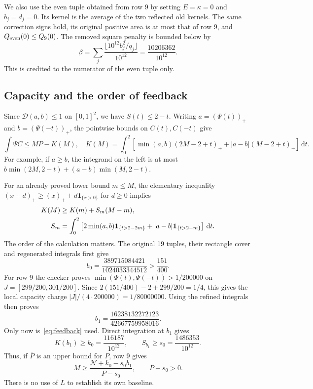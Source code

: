 \documentclass[10pt]{article}
\newcommand{\ind}{\mathbf 1}
\newcommand{\pos}[1]{(#1)_+}
\newcommand{\dd}{\,\mathrm d}
\newcommand{\Ncal}{\mathcal N}
\begin{document}
We also use the even tuple obtained from row 9 by setting $E=\kappa=0$ and $b_j=d_j=0$.
Its kernel is the average of the two reflected old kernels. The same correction signs hold, its original positive area is at most that of row 9, and $Q_{\rm even}(0)\leq Q_9(0)$.
The removed square penalty is bounded below by
\begin{equation}\label{eq:beta}
\beta=\sum_j\frac{\lfloor10^{12}b_j^2/q_j\rfloor}{10^{12}}
     =\frac{10206362}{10^{12}}.
\end{equation}
This is credited to the numerator of the even tuple only.

\subsection{Capacity and the order of feedback}\label{sec:capacity}
Since $\mathcal D(a,b)\leq1$ on $[0,1]^2$, we have $S(t)\leq2-t$.
Writing $a=\pos{\Psi(t)}$ and $b=\pos{\Psi(-t)}$, the pointwise bounds on $C(t),C(-t)$ give
\begin{equation}\label{eq:capacity}
\int\Psi C\leq MP-K(M),
\quad K(M)=\int_0^2\left[\min(a,b)\pos{2M-2+t}+|a-b|\pos{M-2+t}\right]\dd t.
\end{equation}
For example, if $a\geq b$, the integrand on the left is at most
$b\min(2M,2-t)+(a-b)\min(M,2-t)$.

For an already proved lower bound $m\leq M$, the elementary inequality
$\pos{x+d}\geq\pos{x}+d\ind_{\{x>0\}}$ for $d\geq0$ implies
\begin{align}
K(M)&\geq K(m)+S_m(M-m),\label{eq:feedback}\\
S_m&=\int_0^2\left[2\min(a,b)\ind_{\{t>2-2m\}}
                  +|a-b|\ind_{\{t>2-m\}}\right]\dd t.\notag
\end{align}
The order of the calculation matters. The original 19 tuples, their rectangle cover and regenerated integrals first give
\[
b_0=\frac{389715084421}{1024033344512}>\frac{151}{400}.
\]
For row 9 the checker proves $\min(\Psi(t),\Psi(-t))>1/200000$ on
$J=[299/200,301/200]$.
Since $2(151/400)-2+299/200=1/4$, this gives the local capacity charge
$|J|/(4\cdot200000)=1/80000000$.
Using the refined integrals then proves
\begin{equation}\label{eq:baseline}
b_1=\frac{16238132272123}{42667759958016}.
\end{equation}
Only now is~\eqref{eq:feedback} used. Direct integration at $b_1$ gives
\begin{equation}\label{eq:capacity-data}
K(b_1)\geq k_0=\frac{116187}{10^{12}},\qquad
S_{b_1}\geq s_0=\frac{1486353}{10^{12}}.
\end{equation}
Thus, if $\overline P$ is an upper bound for $P$, row 9 gives
\[
M\geq\frac{\Ncal+k_0-s_0b_1}{\overline P-s_0},
\qquad \overline P-s_0>0.
\]
There is no use of $L$ to establish its own baseline.
\end{document}
